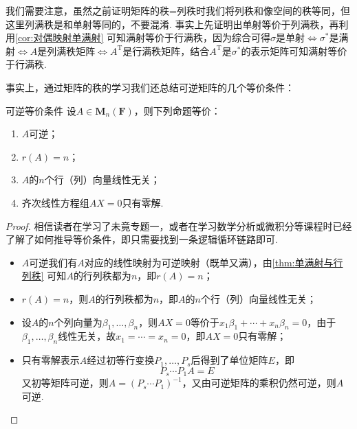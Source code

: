 我们需要注意，虽然之前证明矩阵的秩=列秩时我们将列秩和像空间的秩等同，但这里列满秩是和单射等同的，不要混淆. 事实上先证明出单射等价于列满秩，再利用\autoref{cor:对偶映射单满射} 可知满射等价于行满秩，因为综合可得$\sigma$是单射$\iff\sigma^*$是满射$\iff A$是列满秩矩阵$\iff A^\mathrm{T}$是行满秩矩阵，结合$A^\mathrm{T}$是$\sigma^*$的表示矩阵可知满射等价于行满秩.

事实上，通过矩阵的秩的学习我们还总结可逆矩阵的几个等价条件：
\begin{theorem}{}{可逆等价条件}
    设$A \in \mathbf{M}_n(\mathbf{F})$，则下列命题等价：
    \begin{enumerate}[label=(\arabic*)]
        \item \label{item:11:可逆等价条件:1}
              $A$可逆；

        \item \label{item:11:可逆等价条件:2}
              $r(A)=n$；

        \item \label{item:11:可逆等价条件:3}
              $A$的$n$个行（列）向量线性无关；

        \item \label{item:11:可逆等价条件:4}
              齐次线性方程组$AX=0$只有零解.
    \end{enumerate}
\end{theorem}

\begin{proof}
    相信读者在学习了未竟专题一，或者在学习数学分析或微积分等课程时已经了解了如何推导等价条件，即只需要找到一条逻辑循环链路即可.
    \begin{itemize}
        \item[\ref*{item:11:可逆等价条件:1}$\implies$\ref*{item:11:可逆等价条件:2}] $A$可逆我们有$A$对应的线性映射为可逆映射（既单又满），由\autoref{thm:单满射与行列秩} 可知$A$的行列秩都为$n$，即$r(A)=n$；

        \item[\ref*{item:11:可逆等价条件:2}$\implies$\ref*{item:11:可逆等价条件:3}] $r(A)=n$，则$A$的行列秩都为$n$，即$A$的$n$个行（列）向量线性无关；

        \item[\ref*{item:11:可逆等价条件:3}$\implies$\ref*{item:11:可逆等价条件:4}] 设$A$的$n$个列向量为$\beta_1,\ldots,\beta_n$，则$AX=0$等价于$x_1\beta_1+\cdots+x_n\beta_n=0$，由于$\beta_1,\ldots,\beta_n$线性无关，故$x_1=\cdots=x_n=0$，即$AX=0$只有零解；

        \item[\ref*{item:11:可逆等价条件:4}$\implies$\ref*{item:11:可逆等价条件:1}] 只有零解表示$A$经过初等行变换$P_1,\ldots,P_s$后得到了单位矩阵$E$，即
              \[P_s\cdots P_1A=E\]
              又初等矩阵可逆，则$A=(P_s\cdots P_1)^{-1}$，又由可逆矩阵的乘积仍然可逆，则$A$可逆.
    \end{itemize}
\end{proof}


